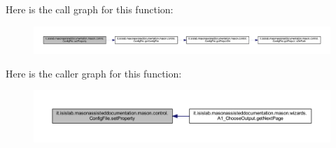 Here is the call graph for this function\-:\nopagebreak
\begin{figure}[H]
\begin{center}
\leavevmode
\includegraphics[width=350pt]{classit_1_1isislab_1_1masonassisteddocumentation_1_1mason_1_1control_1_1_config_file_ae68816366df216e1d9525047c91e77fc_cgraph}
\end{center}
\end{figure}




Here is the caller graph for this function\-:\nopagebreak
\begin{figure}[H]
\begin{center}
\leavevmode
\includegraphics[width=350pt]{classit_1_1isislab_1_1masonassisteddocumentation_1_1mason_1_1control_1_1_config_file_ae68816366df216e1d9525047c91e77fc_icgraph}
\end{center}
\end{figure}




